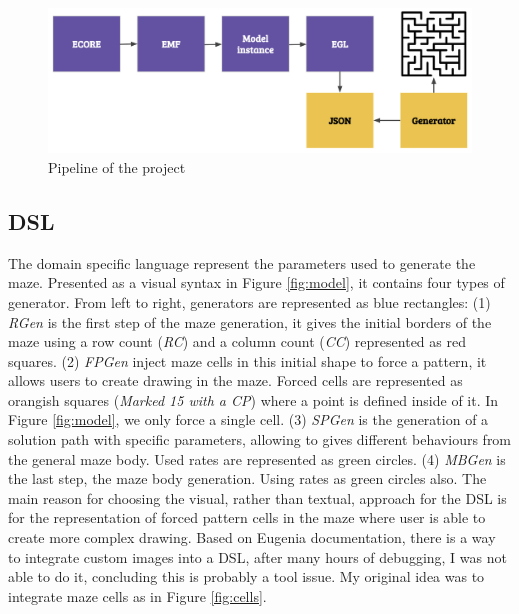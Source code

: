 \documentclass[review]{elsarticle}
\begin{document}
\begin{figure}
	\includegraphics[width=\linewidth]{overview.png}
	\caption{Pipeline of the project}
	\label{fig:overview}
\end{figure}

\subsection{DSL}
The domain specific language represent the parameters used to generate the maze. Presented as a visual syntax in Figure \ref{fig:model}, it contains four types of generator. From left to right, generators are represented as blue rectangles: (1) \textit{RGen} is the first step of the maze generation, it gives the initial borders of the maze using a row count (\textit{RC}) and a column count (\textit{CC}) represented as red squares. (2) \textit{FPGen} inject maze cells in this initial shape to force a pattern, it allows users to create drawing in the maze. Forced cells are represented as orangish squares (\textit{Marked 15 with a CP}) where a point is defined inside of it. In Figure \ref{fig:model}, we only force a single cell. (3) \textit{SPGen} is the generation of a solution path with specific parameters, allowing to gives different behaviours from the general maze body. Used rates are represented as green circles. (4) \textit{MBGen} is the last step, the maze body generation. Using rates as green circles also. The main reason for choosing the visual, rather than textual, approach for the DSL  is for the representation of forced pattern cells in the maze where user is able to create more complex drawing. Based on Eugenia documentation\cite{noauthor_eugenia_nodate}, there is a way to integrate custom images into a DSL, after many hours of debugging, I was not able to do it, concluding this is probably a tool issue. My original idea was to integrate maze cells as in Figure \ref{fig:cells}.
\end{document}
